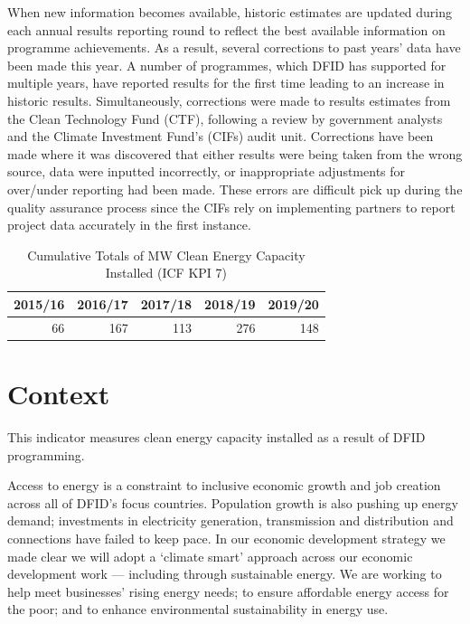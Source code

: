 When new information becomes available, historic estimates are updated during each annual results reporting round to reflect the best available information on programme achievements. %
As a result, several corrections to past years' data have been made this year. %
A number of programmes, which DFID has supported for multiple years, have reported results for the first time leading to an increase in historic results. %
Simultaneously, corrections were made to results estimates from the Clean Technology Fund (CTF), following a review by government analysts and the Climate Investment Fund's (CIFs) audit unit.  %
Corrections have been made where it was discovered that either results were being taken from the wrong source, data were inputted incorrectly, or inappropriate adjustments for over/under reporting had been made. %
These errors are difficult pick up during the quality assurance process since the CIFs rely on implementing partners to report project data accurately in the first instance. %


\begin{table}[htbp]
\centering
\caption{Cumulative Totals of MW Clean Energy Capacity Installed (ICF KPI 7)} 
\label{tab:energy}
\begin{tabular}{rrrrr}
  \toprule
{\textbf{2015/16}} & {\textbf{2016/17}} & {\textbf{2017/18}} & {\textbf{2018/19}} & {\textbf{2019/20}} \\ 
  \midrule
66 & 167 & 113 & 276 & 148 \\ 
   \bottomrule
\end{tabular}
\end{table}



\section{Context}

This indicator measures clean energy capacity installed as a result of DFID
programming. %

Access to energy is a constraint to inclusive economic growth and job creation across all of DFID's focus countries. %
Population growth is also pushing up energy demand; investments in electricity generation, transmission and distribution and connections have failed to keep pace. %
In our economic development strategy we made clear we will adopt a `climate smart' approach across our economic development work --- including through sustainable energy. %
We are working to help meet businesses' rising energy needs; to ensure affordable energy access for the poor; and to enhance environmental sustainability in energy use. %


\newpage
